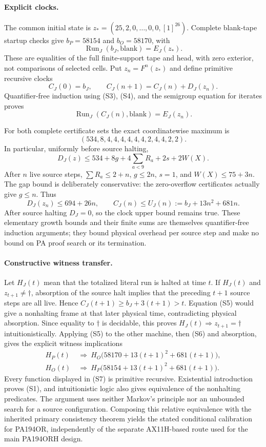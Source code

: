 \paragraph{Explicit clocks.}
The common initial state is
$z_*=(25,2,0,\ldots,0,0,[1]^{26})$.  Complete blank-tape startup
checks give $b_P=58154$ and $b_O=58170$, with
\[
 \operatorname{Run}_J(b_J,\mathrm{blank})=E_J(z_*).
 \tag{S4}
\]
These are equalities of the full finite-support tape and head, with
zero exterior, not comparisons of selected cells.  Put $z_n=F^n(z_*)$
and define primitive recursive clocks
\[
 C_J(0)=b_J,\qquad C_J(n+1)=C_J(n)+D_J(z_n).
\]
Quantifier-free induction using (S3), (S4), and the semigroup equation
for iterates proves
\[
 \operatorname{Run}_J(C_J(n),\mathrm{blank})=E_J(z_n).
 \tag{S5}
\]

For both complete certificate sets the exact coordinatewise maximum is
\[
 (534,8,4,4,4,4,4,4,2,4,4,2,2).
\]
In particular, uniformly before source halting,
\[
 D_J(z)\le534+8g+4\sum_{a<9}R_a+2s+2W(X).
\]
After $n$ live source steps,
$\sum R_a\le2+n$, $g\le2n$, $s=1$, and $W(X)\le75+3n$.
The gap bound is deliberately conservative: the zero-overflow
certificates actually give $g\le n$.  Thus
\[
 D_J(z_n)\le694+26n,\qquad
 C_J(n)\le U_J(n):=b_J+13n^2+681n.
 \tag{S6}
\]
After source halting $D_J=0$, so the clock upper bound remains true.
These elementary growth bounds and their finite sums are themselves
quantifier-free induction arguments; they bound physical overhead per
source step and make no bound on PA proof search or its termination.

\paragraph{Constructive witness transfer.}
Let $H_J(t)$ mean that the totalized literal run is halted at time $t$.
If $H_J(t)$ and $z_{t+1}\ne\dagger$, absorption of the source halt
implies that the preceding $t+1$ source steps are all live.  Hence
$C_J(t+1)\ge b_J+3(t+1)>t$.  Equation (S5) would give a nonhalting
frame at that later physical time, contradicting physical absorption.
Since equality to $\dagger$ is decidable, this proves
$H_J(t)\Rightarrow z_{t+1}=\dagger$ intuitionistically.  Applying
(S5) to the other machine, then (S6) and absorption, gives the explicit
witness implications
\begin{align*}
 H_P(t)&\ \Longrightarrow\
 H_O\bigl(58170+13(t+1)^2+681(t+1)\bigr),\\
 H_O(t)&\ \Longrightarrow\
 H_P\bigl(58154+13(t+1)^2+681(t+1)\bigr).
 \tag{S7}
\end{align*}
Every function displayed in (S7) is primitive recursive.  Existential
introduction proves (S1), and intuitionistic logic also gives
equivalence of the nonhalting predicates.  The argument uses neither
Markov's principle nor an unbounded search for a source configuration.
Composing this relative equivalence with the inherited primary
consistency theorem yields the stated conditional calibration for
PA194OR, independently of the separate AX11H-based route used for
the main PA194ORH design.
